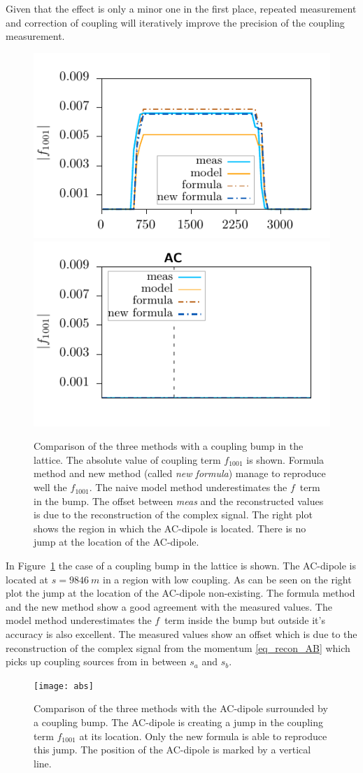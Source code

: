 Given that the effect is only a minor one in the first place, repeated measurement and correction of
coupling will iteratively improve the precision of the coupling measurement.
%
\begin{figure}[h]
  \centering
  \includegraphics[width=.49\linewidth]{forcedcoupling/ac_outside_closed_bump}
  \includegraphics[width=.49\linewidth]{forcedcoupling/ac_outside_closed_bump_at_loc}
  \caption{Comparison of the three methods with a coupling bump in the lattice.
    The absolute value of coupling term $f_{1001}$ is shown.
    Formula method and new method (called \emph{new formula}) manage to reproduce well the $f_{1001}$.
    The naive model method underestimates the $f$~term in the bump.
    The offset between \emph{meas} and the reconstructed values is due to the reconstruction
    of the complex signal.
    The right plot shows the region in which the AC-dipole is located.
    There is no jump at the location of the AC-dipole.
  }
  \label{fig_comp_felix_ryo_ac_outside}
\end{figure}
%
In Figure~\ref{fig_comp_felix_ryo_ac_outside} the case of a coupling bump in the lattice is shown.
The AC-dipole is located at $s=\SI{9846}{m}$ in a region with low coupling. As can be seen on the right plot
the jump at the location of the AC-dipole non-existing. The formula method and the new method show a good
agreement with the measured values. The model method underestimates the $f$~term inside the bump but outside
it's accuracy is also excellent.
The measured values show an offset which is due to the reconstruction of the complex signal from the
momentum \eqref{eq_recon_AB} which picks up coupling sources from in between $s_a$ and $s_b$.
%
\begin{figure}[h]
  \centering
  \texttt{[image: abs]}
  \caption{Comparison of the three methods with the AC-dipole surrounded by a coupling bump.
    The AC-dipole is creating a jump in the coupling term $f_{1001}$ at its location. Only the new
    formula is able to reproduce this jump. The position of the AC-dipole is marked by a vertical
    line.
  }
  \label{fig_comp_felix_ryo}
\end{figure}
%

